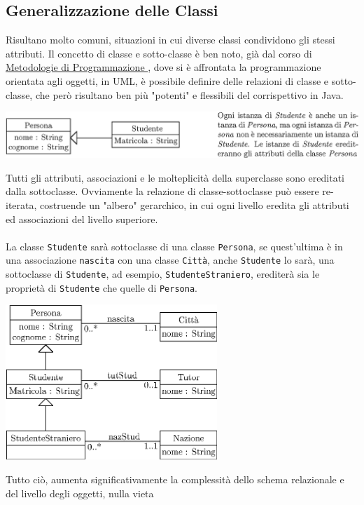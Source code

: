 \documentclass[12pt, letterpaper]{article}
\newcommand{\code}[1]{\colorbox{light-gray}{\texttt{#1}}}
\newcommand{\acc}{\\\hphantom{}\\}
\begin{document}
\subsection{Generalizzazione delle Classi}
Risultano molto comuni, situazioni in cui diverse classi condividono gli stessi attributi. Il concetto di classe e sotto-classe
è ben noto, già dal corso di
\color{blue}\href{https://github.com/CasuFrost/University_notes/blob/main/Primo%20Anno/Secondo%20Semestre/Metodologie%20di%20Programmazione/Appunti%20Metodologie%20di%20programmazione.pdf}{
    Metodologie di Programmazione
}\color{black}, dove si è affrontata la programmazione orientata agli oggetti, in UML, è possibile definire delle relazioni
di classe e sotto-classe, che però risultano ben più "potenti" e flessibili del corrispettivo in Java.\begin{center}
    \includegraphics[width=\textwidth ]{images/sottoclasse..eps}
\end{center}
Tutti gli attributi, associazioni e le molteplicità della superclasse sono ereditati dalla sottoclasse. Ovviamente
la relazione di classe-sottoclasse può essere re-iterata, costruende un "albero" gerarchico, in cui ogni
livello eredita gli attributi ed associazioni del livello superiore.\acc La classe \code{Studente} sarà sottoclasse di
una classe \code{Persona}, se quest'ultima è in una associazione \code{nascita} con una classe \code{Città}, anche
\code{Studente} lo sarà, una sottoclasse di \code{Studente}, ad esempio, \code{StudenteStraniero}, erediterà sia
le proprietà di \code{Studente} che quelle di \code{Persona}. \begin{center}
    \includegraphics[width=0.6\textwidth ]{images/studStraniero.eps}
\end{center}
Tutto ciò, aumenta significativamente la complessità dello schema relazionale e del livello degli oggetti, nulla vieta
\end{document}

